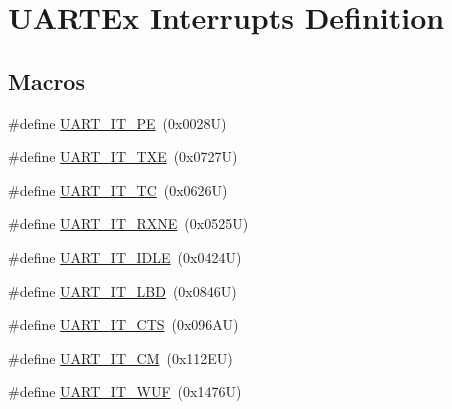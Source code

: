 \hypertarget{group___u_a_r_t___interrupt__definition}{}\section{U\+A\+R\+T\+Ex Interrupts Definition}
\label{group___u_a_r_t___interrupt__definition}
\subsection*{Macros}
\begin{DoxyCompactItemize}
\item 
\#define \hyperlink{group___u_a_r_t___interrupt__definition_ga55f922ddcf513509710ade5d7c40a1db}{U\+A\+R\+T\+\_\+\+I\+T\+\_\+\+PE}~(0x0028\+U)
\item 
\#define \hyperlink{group___u_a_r_t___interrupt__definition_ga552636e2af516d578856f5ee2ba71ed7}{U\+A\+R\+T\+\_\+\+I\+T\+\_\+\+T\+XE}~(0x0727\+U)
\item 
\#define \hyperlink{group___u_a_r_t___interrupt__definition_gab9a4dc4e8cea354fd60f4117513b2004}{U\+A\+R\+T\+\_\+\+I\+T\+\_\+\+TC}~(0x0626\+U)
\item 
\#define \hyperlink{group___u_a_r_t___interrupt__definition_gac1bedf7a65eb8c3f3c4b52bdb24b139d}{U\+A\+R\+T\+\_\+\+I\+T\+\_\+\+R\+X\+NE}~(0x0525\+U)
\item 
\#define \hyperlink{group___u_a_r_t___interrupt__definition_ga9781808d4f9999061fc2da36572191d9}{U\+A\+R\+T\+\_\+\+I\+T\+\_\+\+I\+D\+LE}~(0x0424\+U)
\item 
\#define \hyperlink{group___u_a_r_t___interrupt__definition_gabca5e77508dc2dd9aa26fcb683d9b988}{U\+A\+R\+T\+\_\+\+I\+T\+\_\+\+L\+BD}~(0x0846\+U)
\item 
\#define \hyperlink{group___u_a_r_t___interrupt__definition_ga986d271478550f9afa918262ca642333}{U\+A\+R\+T\+\_\+\+I\+T\+\_\+\+C\+TS}~(0x096\+A\+U)
\item 
\#define \hyperlink{group___u_a_r_t___interrupt__definition_ga4c22e866bce68975a180828012489106}{U\+A\+R\+T\+\_\+\+I\+T\+\_\+\+CM}~(0x112\+E\+U)
\item 
\#define \hyperlink{group___u_a_r_t___interrupt__definition_gab8899f6307781779f65a7c18aabb3204}{U\+A\+R\+T\+\_\+\+I\+T\+\_\+\+W\+UF}~(0x1476\+U)
\end{DoxyCompactItemize}


